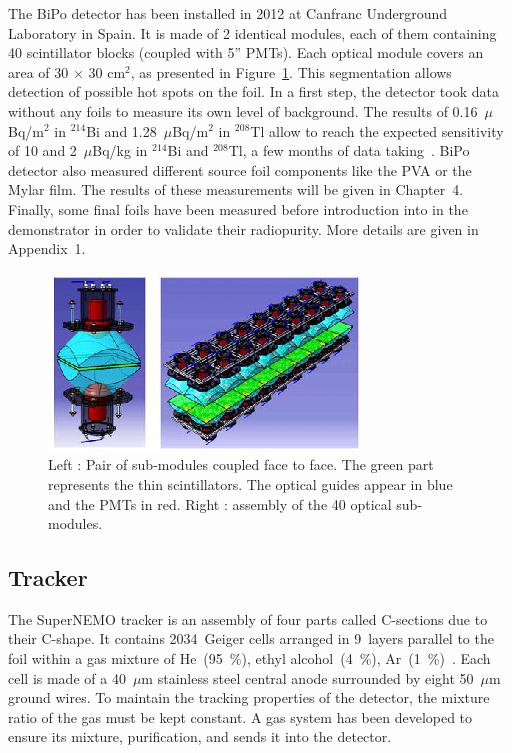 \documentclass[main.tex]{subfiles}
\begin{document}
\NI The BiPo detector has been installed in 2012 at Canfranc Underground Laboratory in Spain. It is made of 2 identical modules, each of them containing 40 scintillator blocks (coupled with 5'' PMTs). Each optical module covers an area of 30 $\times$ 30 cm$^\text{2}$, as presented in Figure~\ref{BiPoDetector}. This segmentation allows detection of possible hot spots on the foil. In a first step, the detector took data without any foils to measure its own level of background. The results of 0.16~$\mu$Bq/m$^\text{2}$ in $^{\text{214}}$Bi and 1.28~$\mu$Bq/m$^\text{2}$ in $^{\text{208}}$Tl allow to reach the expected sensitivity of 10 and 2~$\mu$Bq/kg in $^{\text{214}}$Bi and $^{\text{208}}$Tl, a few months of data taking~\cite{BiPoDetector}. BiPo detector also measured different source foil components like the PVA or the Mylar film. The results of these measurements will be given in Chapter~4. Finally, some final foils have been measured before introduction into in the demonstrator in order to validate their radiopurity. More details are given in Appendix~1.  


\begin{figure}[h!]
\begin{center}
\includegraphics[scale=1.1]{pictures/Chap3/snemo_bipo.png}
\caption{Left : Pair of sub-modules coupled face to face. The green part represents the thin scintillators. The optical guides appear in blue and the PMTs in red. Right : assembly of the 40 optical sub-modules.}
\label{BiPoDetector}
\end{center}
\end{figure}



\FloatBarrier


\subsection{Tracker}


\NI The SuperNEMO tracker is an assembly of four parts called C-sections due to their C-shape. It contains 2034~Geiger cells arranged in 9~layers parallel to the foil within a gas mixture of He~(95~\%), ethyl alcohol~(4~\%), Ar~(1~\%)~\cite{trackerSN}. Each cell is made of a 40~$\mu$m stainless steel central anode surrounded by eight 50~$\mu$m ground wires. To maintain the tracking properties of the detector, the mixture ratio of the gas must be kept constant. A gas system has been developed to ensure its mixture, purification, and sends it into the detector. 
\end{document}

